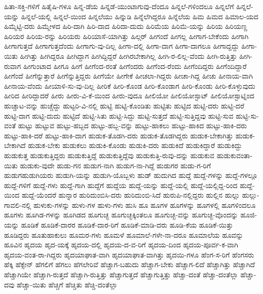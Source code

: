 {ಹಿತಾ-ಸಕ್ತಿ-ಗಳಿಗೆ
ಹಿತೈಷಿ-ಗಳೂ
ಹಿನ್ನ-ಡೆಯ
ಹಿನ್ನಡೆ-ಯುಂಟಾಗುವು-ದೆಂದೂ
ಹಿನ್ನಲೆ-ಗಳಿಂದಲೂ
ಹಿನ್ನಲೆಗೆ
ಹಿನ್ನಲೆ-ಯನ್ನು
ಹಿನ್ನಲೆ-ಯಲ್ಲಿ
ಹಿನ್ನಲೆ-ಯಿಂದ
ಹಿನ್ನಲೆಯು
ಹಿನ್ನುಡಿ
ಹಿನ್ನೆಲೆಗಿದ್ದರೂ
ಹಿನ್ನೆಲೆಯ
ಹಿಮ
ಹಿಮದ
ಹಿಮಾಲ-ಯದ
ಹಿಮ್ಮೆಟ್ಟಿ-ದರು
ಹಿಮ್ಮೇಳದ
ಹಿರಿ-ದಾಗಿ
ಹಿರಿ-ದಾದ
ಹಿರಿದಾ-ದುದು
ಹಿರಿಮೆಯ
ಹಿರಿಮೆ-ಯನ್ನು
ಹಿರಿಯ
ಹಿರಿಯಣ್ಣ
ಹಿರಿಯರ
ಹಿರಿಯ-ರನ್ನು
ಹಿರಿಯರು
ಹಿರಿಯಾಸೆ-ಯಾಗಿತ್ತು
ಹಿಲ್ಗರ್
ಹೀಗಂದೆ
ಹೀಗಲ್ಲ
ಹೀಗಾಗ-ಬೇಕೆಂದು
ಹೀಗಾಗಿ
ಹೀಗಾಗುತ್ತದೆ
ಹೀಗಾಗುತ್ತದೆಂದು
ಹೀಗಾಗು-ವು-ದಿಲ್ಲ
ಹೀಗಾ-ದಲ್ಲಿ
ಹೀಗಾ-ದಾಗ
ಹೀಗಾ-ದಾಗಲೂ
ಹೀಗಾದ್ದದ್ದು
ಹೀಗಾ-ಯಿತು
ಹೀಗಿತ್ತು
ಹೀಗಿದ್ದರೂ
ಹೀಗಿದ್ದಾಗ
ಹೀಗಿದ್ದಿದ್ದರೆ
ಹೀಗಿರಬೇಕಾಗಿಲ್ಲ
ಹೀಗಿ-ರ-ಲಿಲ್ಲ-ವೆಂದು
ಹೀಗಿ-ರುತ್ತಿತ್ತು
ಹೀಗಿ-ರುವಾಗ
ಹೀಗುಂಟಾದ
ಹೀಗೂ
ಹೀಗೆ
ಹೀಗೆಂದ-ರಂತೆ
ಹೀಗೆಂದರು
ಹೀಗೆಂದ-ರೆಂದು
ಹೀಗೆಂದಿದ್ದರು
ಹೀಗೆಂದಿದ್ದಾರೆ
ಹೀಗೆಂದೆ
ಹೀಗೆನ್ನುತ್ತಾರೆ
ಹೀಗೆನ್ನುತ್ತಿದ್ದರು
ಹೀಗೆಯೇ
ಹೀಗೇಕೆ
ಹೀಚಲಾ-ಗಿದ್ದರು
ಹೀಚಾ-ಗಿದ್ದ
ಹೀಚು
ಹೀನಾಯ-ವಾಗಿ
ಹೀನಾಯ-ವೆಂದು
ಹೀಯಾಳಿ-ಸು-ವು-ದಿಲ್ಲ
ಹೀರಿಕೆ
ಹೀರಿ-ಕೊಂಡ
ಹೀರಿ-ಕೊಂಡಾಗ
ಹೀರಿ-ಕೊಂಡು
ಹೀರಿ-ಕೊಳ್ಳುವುದು
ಹೀರಿದ
ಹೀರಿದ್ದಾದರೆ
ಹೀರು
ಹೀರು-ವಿ-ಕೆ-ಯಿಂದ
ಹೀರು-ವುದೂ
ಹೀಲಿಯೋ
ಹೀಲಿಯೋಸ್ಟಾಟ್
ಹೀಲಿಯೋಸ್ಟಾಟ್ನಿಂದ
ಹುಚ್ಚಾಟ-ವನ್ನು
ಹುಚ್ಚೆದ್ದು
ಹುಟ್ಟರಿ-ವಿ-ನಲ್ಲಿ
ಹುಟ್ಟಿ
ಹುಟ್ಟಿ-ಕೊಂಡಿತು
ಹುಟ್ಟಿತು
ಹುಟ್ಟಿದ
ಹುಟ್ಟಿ-ದರು
ಹುಟ್ಟಿ-ದರೆ
ಹುಟ್ಟಿ-ದಾಗ
ಹುಟ್ಟಿ-ದುದು
ಹುಟ್ಟಿದೆ
ಹುಟ್ಟಿ-ಸಿತು
ಹುಟ್ಟಿ-ಸಿದ್ದು
ಹುಟ್ಟಿ-ಸುತ್ತದೆ
ಹುಟ್ಟಿ-ಸುತ್ತಿದ್ದವು
ಹುಟ್ಟಿ-ಸುವ
ಹುಟ್ಟಿ-ಸು-ವಂತೆ
ಹುಟ್ಟು
ಹುಟ್ಟುವ
ಹುಟ್ಟು-ಹಬ್ಬದ
ಹುಟ್ಟು-ಹಬ್ಬ-ವನ್ನು
ಹುಟ್ಟು-ಹಾಕಲು
ಹುಟ್ಟು-ಹಾಕಿದ
ಹುಟ್ಟು-ಹಾಕಿ-ದರು
ಹುಟ್ಟು-ಹಾಕಿ-ದರೆ
ಹುಟ್ಟು-ಹಾಕಿ-ದಾಗ
ಹುಡುಕ-ತೊಡಗಿ-ದರು
ಹುಡುಕ-ತೊಡಗಿದ್ದರು
ಹುಡುಕ-ಬೇಕಾಗಿತ್ತು
ಹುಡುಕ-ಬೇಕಾಗಿದೆ
ಹುಡುಕ-ಬೇಕು
ಹುಡುಕಲು
ಹುಡುಕಿ-ಕೊಂಡು
ಹುಡುಕಿ-ದರು
ಹುಡುಕಿದೆ
ಹುಡುಕಿದ್ದಾರೆ
ಹುಡುಕಿದ್ದು
ಹುಡುಕುತ್ತ
ಹುಡುಕುತ್ತಿದ್ದರು
ಹುಡುಕುತ್ತಿದ್ದೆ
ಹುಡುಕುತ್ತಿದ್ದೆವು
ಹುಡುಕುತ್ತಿ-ರುವು-ದನ್ನು
ಹುಡುಕುವ
ಹುಡುಕುವಂತಾ-ಯಿತು
ಹುಡುಕು-ವುದೇ
ಹುಡು-ಗನ
ಹುಡುಗ-ನಾಗಿ
ಹುಡುಗ-ನಾ-ಗಿದ್ದೆ
ಹುಡುಗರ
ಹುಡು-ಗ-ರಿಗೆ
ಹುಡುಗಹುಡುಗಿಯರು
ಹುಡುಗಿ-ಯನ್ನು
ಹುಡುಗಿ-ಯೊಬ್ಬಳು
ಹುಡ್
ಹುದುಗಿದ
ಹುದ್ದೆ
ಹುದ್ದೆ-ಗಳನ್ನು
ಹುದ್ದೆ-ಗಳಲ್ಲೂ
ಹುದ್ದೆ-ಗಳಿಗೆ
ಹುದ್ದೆ-ಗಳು
ಹುದ್ದೆ-ಗಾಗಿ
ಹುದ್ದೆಗೆ
ಹುದ್ದೆಯ
ಹುದ್ದೆ-ಯನ್ನು
ಹುದ್ದೆ-ಯಲ್ಲಿ
ಹುದ್ದೆ-ಯಲ್ಲಿದ್ದ-ರಿಂದ
ಹುದ್ದೆ-ಯಿಂದ
ಹುದ್ದೆ-ಯೆಂದರೆ
ಹುನ್ನಾರ
ಹುರಿದುಂಬಿಸಿ-ದರು
ಹುರಿದುಂಬಿ-ಸಿದೆ
ಹುರುಪಿ-ನಲ್ಲಿದ್ದರು
ಹುಲ್ಲಿನ
ಹುಲ್ಲು
ಹುಲ್ಲು-ಗಾವಲಿ-ನಲ್ಲಿ
ಹುಳುಕು-ಗಳನ್ನು
ಹುಳು-ಗಳ
ಹುಳು-ಗಳು
ಹುಸಿ
ಹೂ
ಹೂಗಳ
ಹೂಗಳನ್ನು
ಹೂಗಳಲ್ಲಿ
ಹೂಗಳಿಂದಲೂ
ಹೂಗಳು
ಹೂಗಿಡ-ಗಳನ್ನು
ಹೂಗಿಡದ
ಹೂಗುಚ್ಛ
ಹೂಗುಚ್ಛಕ್ಕಿಂತಲೂ
ಹೂಗುಚ್ಛ-ವನ್ನು
ಹೂಗುಚ್ಛ-ವೊಂದನ್ನು
ಹೂಜಿ-ಯನ್ನು
ಹೂಡಿಕೆ
ಹೂಡಿಕೆ-ದಾರರ
ಹೂಡಿಕೆ-ದಾರ-ರಿಗೆ
ಹೂಡಿಕೆ-ಮಾಡಿ-ದರು
ಹೂಡಿ-ಕೆಯ
ಹೂಡಿಕೆ-ಯಿತ್ತು
ಹೂಡಿದ್ದರು
ಹೂತುಹಾಕುಲು
ಹೂಮರ-ಗಳು
ಹೂಮಳೆ
ಹೂಮಾಲೆ-ಗಳೇ-ನಾ-ದರೂ
ಹೂಮಾಲೆಯ
ಹೂವನ್ನು
ಹೂವಿನ
ಹೃದಯ
ಹೃದ-ಯಕ್ಕೆ
ಹೃದಯ-ದಲ್ಲಿ
ಹೃದಯ-ದ-ವ-ರಿಗೆ
ಹೃದಯ-ದಿಂದ
ಹೃದಯ-ಪೂರ್ವ-ಕ-ವಾಗಿ
ಹೃದಯ-ವಂತ-ರಾ-ಗಿದ್ದರು
ಹೃದಯಾಘಾತ-ವಾಗಿ
ಹೃದಯಾಘಾತ-ವಾಗಿತ್ತು
ಹೃದಯಿ-ಗಳೂ
ಹೆಂಗ-ಸ-ರಿಗೆ
ಹೆಂಗಸರು
ಹೆಕ್ಕಿ
ಹೆಕ್ಸೇನ್
ಹೆಗಲಿಗೆ
ಹೆಗಲು
ಹೆಗಲೇರಿವೆ
ಹೆಚ್ಚಾಗ-ಬಹುದು
ಹೆಚ್ಚಾಗ-ಬೇಕು
ಹೆಚ್ಚಾಗ-ಲಿದೆ
ಹೆಚ್ಚಾಗಿತ್ತು
ಹೆಚ್ಚಾಗಿದೆ
ಹೆಚ್ಚಾಗಿಯೇ
ಹೆಚ್ಚಾಗಿ-ರುತ್ತದೆ
ಹೆಚ್ಚಾಗಿ-ರುತ್ತಿತ್ತು
ಹೆಚ್ಚಾಗುತ್ತದೆ
ಹೆಚ್ಚಾಗುತ್ತಿತ್ತು
ಹೆಚ್ಚಾ-ದಂತೆ
ಹೆಚ್ಚಾ-ದಂತೆಲ್ಲಾ
ಹೆಚ್ಚಾ-ದವು
ಹೆಚ್ಚಾ-ಯಿತು
ಹೆಚ್ಚಿಗೆ
ಹೆಚ್ಚಿತು
ಹೆಚ್ಚಿ-ದಂತೆಲ್ಲಾ
}

